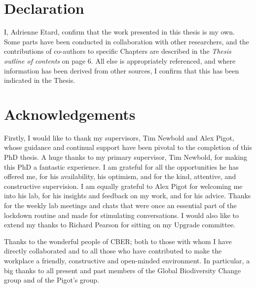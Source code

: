 \documentclass[11pt]{report}
\begin{document}
\begin{refsection}



\chapter*{Declaration}

I, Adrienne Etard, confirm that the work presented in this thesis is my own. Some parts have been conducted in collaboration with other researchers, and the contributions of co-authors to specific Chapters are described in the \textit{Thesis outline of contents} on page 6. All else is appropriately referenced, and where information has been derived from other sources, I confirm that this has been indicated in the Thesis.


\clearpage

\chapter*{Acknowledgements}

Firstly, I would like to thank my supervisors, Tim Newbold and Alex Pigot, whose guidance and continual support have been pivotal to the completion of this PhD thesis.
A huge thanks to my primary supervisor, Tim Newbold, for making this PhD a fantastic experience. I am grateful for all the opportunities he has offered me, for his availability, his optimism, and for the kind, attentive, and constructive supervision.
I am equally grateful to Alex Pigot for welcoming me into his lab, for his insights and feedback on my work, and for his advice. Thanks for the weekly lab meetings and chats that were once an essential part of the lockdown routine and made for stimulating conversations.
I would also like to extend my thanks to Richard Pearson for sitting on my Upgrade committee.

Thanks to the wonderful people of CBER; both to those with whom I have directly collaborated and to all those who have contributed to make the workplace a friendly, constructive and open-minded environment. In particular, a big thanks to all present and past members of the Global Biodiversity Change group and of the Pigot’s group.


\end{refsection}
\end{document}
